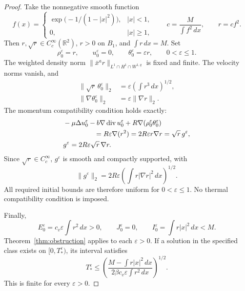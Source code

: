 \documentclass[11pt,letterpaper]{article}
\numberwithin{equation}{section}
\theoremstyle{definition}
\newcommand{\R}{\mathbb R}
\newcommand{\dd}{\,dx}
\newcommand{\Div}{\operatorname{div}}
\newcommand{\norm}[2]{\lVert#1\rVert_{#2}}
\begin{document}
\begin{proof}
Take the nonnegative smooth function
\[
 f(x)=
 \begin{cases}
 \exp\bigl(-1/(1-|x|^2)\bigr),&|x|<1,\\
 0,&|x|\ge1,
 \end{cases}
 \qquad
 c=\frac{M}{\int f^2\dd},
 \qquad r=cf^2.
\]
Then $r,\sqrt r\in C_c^\infty(\R^2)$, $r>0$ on $B_1$, and
$\int r\dd=M$. Set
\begin{equation}
 \rho_0^\varepsilon=r,\qquad
 u_0^\varepsilon=0,\qquad
 \theta_0^\varepsilon=\varepsilon r,
 \qquad 0<\varepsilon\le1.
 \label{eq:familydefinition}
\end{equation}
The weighted density norm
$\norm{\bar x^a r}{L^1\cap H^1\cap W^{1,q}}$ is fixed and finite.
The velocity norms vanish, and
\begin{equation}
 \begin{aligned}
 \norm{\sqrt r\,\theta_0^\varepsilon}{2}
       &=\varepsilon\left(\int r^3\dd\right)^{1/2},\\
 \norm{\nabla\theta_0^\varepsilon}{2}
       &=\varepsilon\norm{\nabla r}{2}.
 \end{aligned}\label{eq:familynorms}
\end{equation}
The momentum compatibility condition holds exactly:
\begin{align}
 &-\mu\Delta u_0^\varepsilon
       -b\nabla\Div u_0^\varepsilon
       +R\nabla(\rho_0^\varepsilon\theta_0^\varepsilon)\notag\\
 &\hspace{16mm}=R\varepsilon\nabla(r^2)
       =2R\varepsilon r\nabla r
       =\sqrt r\,g^\varepsilon,\notag\\
 &g^\varepsilon=2R\varepsilon\sqrt r\,\nabla r.
 \label{eq:familycompatibility}
\end{align}
Since $\sqrt r\in C_c^\infty$, $g^\varepsilon$ is smooth and
compactly supported, with
\begin{equation}
 \norm{g^\varepsilon}{2}
       =2R\varepsilon
                \left(\int r|\nabla r|^2\dd\right)^{1/2}.
 \label{eq:familygbound}
\end{equation}
All required initial bounds are therefore uniform for
$0<\varepsilon\le1$. No thermal compatibility condition is imposed.

Finally,
\begin{equation}
 E_0^\varepsilon=c_v\varepsilon\int r^2\dd>0,\qquad
 J_0^\varepsilon=0,\qquad
 I_0^\varepsilon=\int r|x|^2\dd<M.
 \label{eq:familyenergy}
\end{equation}
Theorem~\ref{thm:obstruction} applies to each $\varepsilon>0$.
If a solution in the specified class exists on $[0,T_*^\varepsilon)$,
its interval satisfies
\begin{equation}
 T_*^\varepsilon
       \le\left(\frac{M-\int r|x|^2\dd}
                 {2\beta c_v\varepsilon\int r^2\dd}\right)^{1/2}.
 \label{eq:familylifespan}
\end{equation}
This is finite for every $\varepsilon>0$.
\end{proof}
\end{document}
